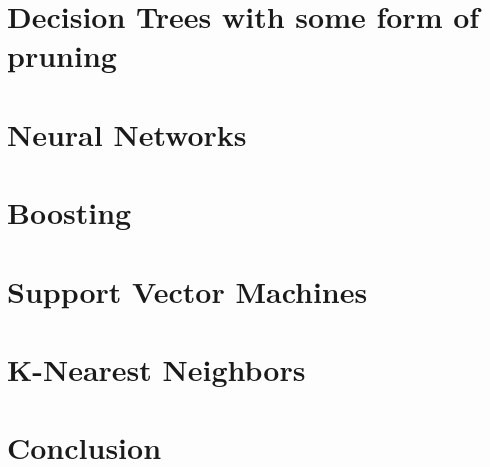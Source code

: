 \documentclass[twocolumn, a4paper, 10pt]{article}
\begin{document}
	\section{Decision Trees with some form of pruning}
	\section{Neural Networks}
	\section{Boosting}
	\section{Support Vector Machines}
	\section{K-Nearest Neighbors}
	\section{Conclusion}
\end{document}
